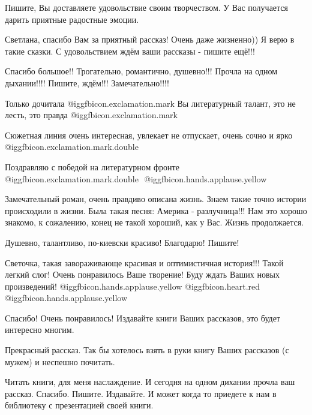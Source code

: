 \begin{itemize}
Пишите, Вы доставляете удовольствие своим творчеством. У Вас получается дарить
приятные радостные эмоции.


Светлана, спасибо Вам за приятный рассказ! Очень даже жизненно)) Я верю в такие
сказки. С удовольствием ждём ваши рассказы - пишите ещё!!!


Спасибо большое!! Трогательно, романтично, душевно!!! Прочла на одном
дыхании!!!! Пишите, ждём!!! Замечательно!!!!


Только дочитала @igg{fbicon.exclamation.mark} Вы литературный талант, это не
лесть, это правда @igg{fbicon.exclamation.mark}

Сюжетная линия очень интересная, увлекает не отпускает,
очень сочно и ярко @igg{fbicon.exclamation.mark.double} 

Поздравляю с победой на литературном фронте @igg{fbicon.exclamation.mark.double} ️ 
@igg{fbicon.hands.applause.yellow} 


Замечательный роман, очень правдиво описана жизнь. Знаем такие точно истории
происходили в жизни. Была такая песня: Америка - разлучница!!! Нам это хорошо
знакомо, к сожалению, конец не такой хороший, как у Вас. Жизнь продолжается.

Душевно, талантливо, по-киевски красиво! Благодарю! Пишите!


Светочка, такая завораживающе красивая и оптимистичная история!!! Такой легкий
слог! Очень понравилось Ваше творение! Буду ждать Ваших новых произведений!
 @igg{fbicon.hands.applause.yellow} @igg{fbicon.heart.red} @igg{fbicon.hands.applause.yellow} 


Спасибо! Очень понравилось! Издавайте книги Ваших рассказов, это будет
интересно многим.


Прекрасный рассказ. Так бы хотелось взять в руки книгу Ваших рассказов (с
мужем) и неспешно почитать.


Читать книги, для меня наслаждение. И сегодня на одном дихании прочла ваш
рассказ. Спасибо. Пишите. Издавайте. И может когда то приедете к нам в
библиотеку с презентацией своей книги.


\end{itemize}
